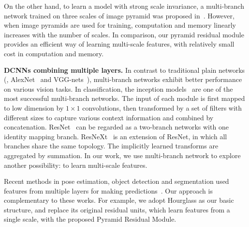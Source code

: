 \documentclass[10pt,twocolumn,letterpaper]{article}
\newcommand{\smalltitle}[1]{\vspace{0.2em}\noindent \textbf{{#1}}}
\begin{document}
On the other hand, to learn a model with strong scale invariance, a multi-branch network trained on three scales of image pyramid was proposed in~\cite{tompson2015efficient}. However, when image pyramids are used for training,  computation and memory linearly increases with the number of scales. In comparison, our pyramid residual module provides an efficient way of learning multi-scale features, with relatively small cost in computation and memory.
																										  

%

\smalltitle{DCNNs combining multiple layers. }
In contrast to traditional plain networks (\eg, AlexNet~\cite{krizhevsky2012imagenet} and VGG-nets~\cite{simonyan2014very}), multi-branch networks exhibit better performance on various vision tasks. 
In classification, the inception models~\cite{szegedy2015going,ioffe2015batch,szegedy2016rethinking,szegedy2016inception} are one of the most successful multi-branch networks. 
The input of each module is first mapped to low dimension by $1\times1$ convolutions, then transformed by a set of filters with different sizes to capture various context information and combined by concatenation. 
ResNet~\cite{he2016deep,he2016identity} can be regarded as a two-branch networks with one identity mapping branch. 
ResNeXt~\cite{xie2016aggregated} is an extension of ResNet, in which all branches share the same topology. The implicitly learned transforms are aggregated by summation. In our work, we use multi-branch network to explore another possibility: to learn multi-scale features. 

Recent methods in pose estimation, object detection and segmentation used features from multiple layers for making predictions~\cite{liu2016ssd,cai2016unified, hariharan2015hypercolumns,bell2016inside,newell2016stacked,chen2016deeplab}. Our approach is complementary to these works. 
For example, we adopt Hourglass as our basic structure, and replace its original residual units, which learn features from a single scale, with the proposed Pyramid Residual Module. 

																																				  
\end{document}
